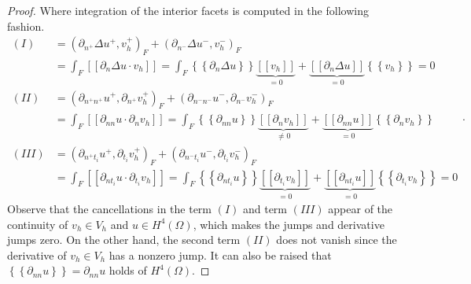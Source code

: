 \documentclass[11pt]{article}
\theoremstyle{remark}
\newcommand{\mean}[1]{\left\{\!\!\left\{#1\right\}\!\!\right\}}
\newcommand{\jump}[1]{\left[\!\left[ #1 \right]\!\right]}
\numberwithin{equation}{section}
\begin{document}
\begin{proof}
Where integration of the interior facets is computed in the following fashion.
\begin{equation}
    \label{eq:dg2_facets}
    \begin{split}
        (I) &  =    \left(\partial _{n^{+}} \Delta  u^{+} ,v_h^{+}\right)_{F} +
        \left(\partial _{n^{-}} \Delta  u^{-} ,v_h^{-}\right)_{F}  \\
            & =   \int_{F}^{}
            \jump{ \partial _{n} \Delta  u \cdot v_h } =
            \int_{F}^{}
            \mean{ \partial _{n} \Delta  u } \underbrace{\jump{ v_h }}_{= 0}    + \underbrace{\jump{ \partial _{n} \Delta  u
            }}_{= 0}    \mean{ v_h } = 0 \\
            (II) &  =     \left(\partial _{n^{+}n^{+}} u^{+}, \partial_{n^{+}} v_h^{+} \right)_{F} +  \left(\partial _{n^{-}n^{-}} u^{-}, \partial_{n^{-}} v_h^{-} \right)_{F}    \\
                 &= \int_{F}^{} \jump{ \partial _{nn} u \cdot  \partial_{n} v_h }   = \int_{F}^{}
                       \mean{ \partial _{nn} u    } \underbrace{\jump{ \partial_{n} v_h }  }_{\neq 0}    + \underbrace{\jump{ \partial
                               _{nn}  u
                       }}_{= 0}    \mean{ \partial _{n}v_h } \\
            (III) &  =     \left(\partial _{n^{+}t_{i}} u^{+}, \partial_{t_{i}} v_h^{+}
                \right)_{F} +  \left(\partial _{n^{-}t_{i}} u^{-}, \partial_{t_{i}} v_h^{-}
                \right)_{F}   \\
                 &  =   \int_{F}^{}
                 \jump{ \partial _{nt_{i}} u \cdot  \partial_{t_{i}} v_h } =
                 \int_{F}^{}
                 \mean{ \partial _{nt_{i}} u    } \underbrace{\jump{ \partial_{t_{i}} v_h }  }_{= 0}    + \underbrace{\jump{ \partial
                         _{nt_{i}}  u
                 }}_{= 0}    \mean{ \partial _{t_{i}}v_h }  = 0
                   \end{split}
.\end{equation}
Observe that the cancellations in the term $(I)$ and term $(III)$  appear of the continuity of $v_h\in V_{h} $ and $u\in H^{4}( \Omega ) $, which makes the jumps and derivative jumps zero. On the other hand, the second term $(II)$  does not vanish
since the derivative of $v_h \in V_{h}$ has a nonzero jump. It can also be raised that $\mean{
\partial _{nn} u } = \partial _{nn} u  $ holds of $H^{4}( \Omega  ) $.


\end{proof}
\end{document}
